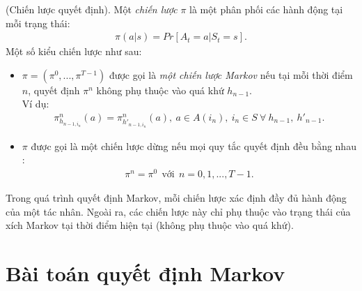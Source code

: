 \begin{dn}\rm
(Chiến lược quyết định). Một\textit{ chiến lược }$\pi$ là một phân phối các hành động tại mỗi trạng thái:
\begin{align*}
\pi (a|s)=Pr[A_t=a|S_t=s].
\end{align*}
Một số kiểu chiến lược như sau:
\begin{itemize}
\item $\pi=(\pi^0,...,\pi^{T-1})$ được gọi là \textit{một chiến lược Markov} nếu tại mỗi thời điểm $n$, quyết định $\pi^n$ không phụ thuộc vào quá khứ $h_{n-1}$.\\
 Ví dụ: \begin{align*}
 \pi_{h_{n-1,i_n}}^{n}(a)=\pi_{h'_{n-1,i_n}}^{n}(a),~ a \in A(i_n), ~i_n \in S ~\forall ~h_{n-1},~h'_{n-1}.
 \end{align*}
 \item $\pi$ được gọi là một chiến lược dừng nếu mọi quy tắc quyết định đều bằng nhau :
 \begin{align*}
 \pi^n=\pi^0~~\text{với}~~n=0,1,...,T-1.
 \end{align*}
\end{itemize}
Trong quá trình quyết định Markov, mỗi chiến lược xác định đầy đủ hành động của một tác nhân. Ngoài ra, các chiến lược này chỉ phụ thuộc vào trạng thái của xích Markov tại thời điểm hiện tại (không phụ thuộc vào quá khứ).
\end{dn}
\section{Bài toán quyết định Markov}
